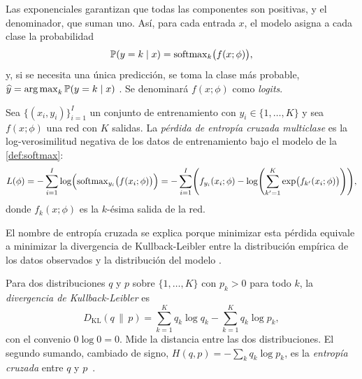 Las exponenciales garantizan que todas las componentes son positivas, y el
denominador, que suman uno. Así, para cada entrada $x$, el modelo asigna a cada
clase la probabilidad
\[
  \mathbb{P}(y = k \mid x) = \operatorname{softmax}_k\bigl(f(x;\phi)\bigr),
\]
y, si se necesita una única predicción, se toma la clase más probable,
$\widehat{y} = \operatorname*{arg\,max}_k \mathbb{P}(y = k \mid x)$
\cite[sec.~5.5]{prince2023understanding}. Se denominará $f(x;\phi)$ como
\emph{logits}.

\begin{definicion}\label{def:entropia-cruzada}
Sea $\{(x_i, y_i)\}_{i=1}^{I}$ un conjunto de entrenamiento con
$y_i\in\{1,\dots,K\}$ y sea $f(x;\phi)$ una red con $K$ salidas. La
\emph{pérdida de entropía cruzada multiclase} es la log-verosimilitud negativa de
los datos de entrenamiento bajo el modelo de la \cref{def:softmax}:
\[
  L(\phi) = -\sum_{i=1}^{I} \log\Bigl(\operatorname{softmax}_{y_i}\bigl(f(x_i;\phi)\bigr)\Bigr)
          = -\sum_{i=1}^{I} \Biggl( f_{y_i}(x_i;\phi) - \log\Biggl(\sum_{k'=1}^{K}\exp\bigl(f_{k'}(x_i;\phi)\bigr)\Biggr)\Biggr),
\]
donde $f_k(x;\phi)$ es la $k$-ésima salida de la red.
\end{definicion}

El nombre de entropía cruzada se explica porque minimizar esta pérdida equivale a
minimizar la divergencia de Kullback-Leibler entre la distribución empírica de
los datos observados y la distribución del modelo
\cite[sec.~5.7]{prince2023understanding}.

Para dos distribuciones $q$ y $p$ sobre $\{1,\dots,K\}$ con $p_k > 0$ para todo
$k$, la \emph{divergencia de Kullback-Leibler} es
\[
  D_{\mathrm{KL}}(q \,\|\, p) = \sum_{k=1}^{K} q_k \log q_k - \sum_{k=1}^{K} q_k \log p_k,
\]
con el convenio $0\log 0 = 0$. Mide la distancia entre las dos distribuciones. El
segundo sumando, cambiado de signo, $H(q,p) = -\sum_k q_k\log p_k$, es la
\emph{entropía cruzada} entre $q$ y $p$~\cite[sec.~5.7]{prince2023understanding}.

